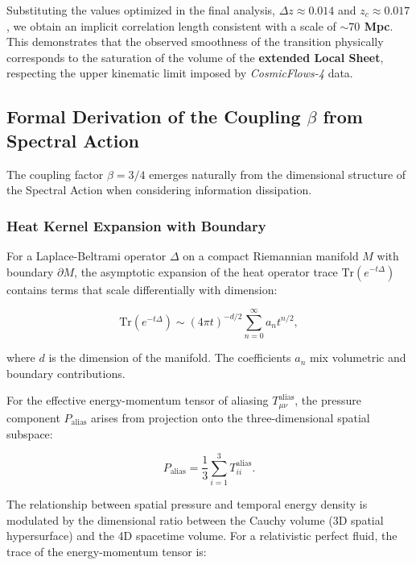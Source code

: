 \documentclass[12pt, a4paper]{article}
\theoremstyle{plain}
\theoremstyle{definition}
\begin{document}
Substituting the values optimized in the final analysis, \textbf{$\Delta z \approx 0.014$} and \textbf{$z_c \approx 0.017$}, we obtain an implicit correlation length consistent with a scale of \textbf{$\sim 70$ Mpc}. This demonstrates that the observed smoothness of the transition physically corresponds to the saturation of the volume of the \textbf{extended Local Sheet}, respecting the upper kinematic limit imposed by \textit{CosmicFlows-4} data.


\subsection{Formal Derivation of the Coupling \texorpdfstring{$\beta$}{beta} from Spectral Action}
\label{app:beta_spectral}

The coupling factor $\beta = 3/4$ emerges naturally from the dimensional structure of the Spectral Action when considering information dissipation.

\subsubsection{Heat Kernel Expansion with Boundary}

For a Laplace-Beltrami operator $\Delta$ on a compact Riemannian manifold $M$ with boundary $\partial M$, the asymptotic expansion of the heat operator trace $\text{Tr}(e^{-t\Delta})$ contains terms that scale differentially with dimension:

\begin{equation}
\text{Tr}(e^{-t\Delta}) \sim (4\pi t)^{-d/2} \sum_{n=0}^\infty a_n t^{n/2},
\end{equation}

where $d$ is the dimension of the manifold. The coefficients $a_n$ mix volumetric and boundary contributions.

For the effective energy-momentum tensor of aliasing $T_{\mu\nu}^{\text{alias}}$, the pressure component $P_{\text{alias}}$ arises from projection onto the three-dimensional spatial subspace:

\begin{equation}
P_{\text{alias}} = \frac{1}{3} \sum_{i=1}^3 T_{ii}^{\text{alias}}.
\end{equation}

The relationship between spatial pressure and temporal energy density is modulated by the dimensional ratio between the Cauchy volume (3D spatial hypersurface) and the 4D spacetime volume. For a relativistic perfect fluid, the trace of the energy-momentum tensor is:
\end{document}
